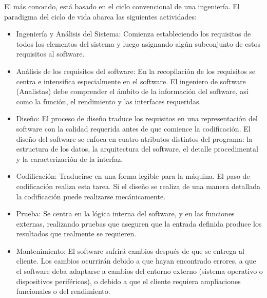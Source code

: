\documentclass[10pt]{article}
\begin{document}
El más conocido, está basado en el ciclo convencional de una ingeniería. El paradigma del ciclo de vida abarca las siguientes actividades:
\begin{itemize}
\item Ingeniería y Análisis del Sistema: Comienza estableciendo los requisitos de todos los elementos del sistema y luego asignando algún subconjunto de estos requisitos al software.
\item Análisis de los requisitos del software: En la recopilación de los requisitos se centra e intensifica especialmente en el software. El ingeniero de software (Analistas) debe comprender el ámbito de la información del software, así como la función, el rendimiento y las interfaces requeridas.
\item Diseño: El proceso de diseño traduce los requisitos en una representación del software con la calidad requerida antes de que comience la codificación. El diseño del software se enfoca en cuatro atributos distintos del programa: la estructura de los datos, la arquitectura del software, el detalle procedimental y la caracterización de la interfaz. 
\item Codificación: Traducirse en una forma legible para la máquina. El paso de codificación realiza esta tarea. Si el diseño se realiza de una manera detallada la codificación puede realizarse mecánicamente.
\item Prueba: Se centra en la lógica interna del software, y en las funciones externas, realizando pruebas que aseguren que la entrada definida produce los resultados que realmente se requieren.
\item Mantenimiento: El software sufrirá cambios después de que se entrega al cliente. Los cambios ocurrirán debido a que hayan encontrado errores, a que el software deba adaptarse a cambios del entorno externo (sistema operativo o dispositivos periféricos), o debido a que el cliente requiera ampliaciones funcionales o del rendimiento. 

\end{itemize}
\end{document}

